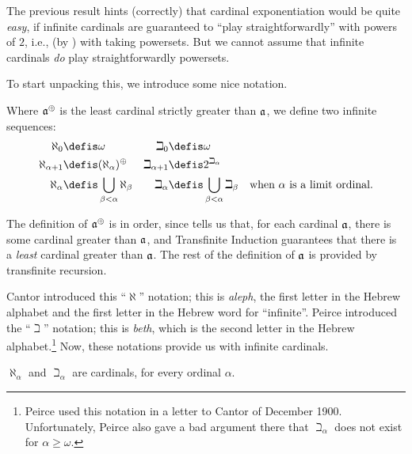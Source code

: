 \documentclass[../../../include/open-logic-section]{subfiles}
\begin{document}


The previous result hints (correctly) that cardinal exponentiation
would be quite \emph{easy}, if infinite cardinals are guaranteed to
``play straightforwardly'' with powers of $2$, i.e., (by
) with taking powersets. But we
cannot assume that infinite cardinals \emph{do} play straightforwardly 
powersets. 

To start unpacking this, we introduce some nice notation.

\begin{defn}
Where $\mathfrak{a}^{\oplus}$ is the least cardinal strictly greater
than $\mathfrak{a}$, we define two infinite sequences:
\begin{align*}
	\aleph_{0} &\defis \omega & 		
	\beth_{0} &\defis \omega\\
	\aleph_{\alpha \ordplus 1} &\defis \cardsucc{(\aleph_{\alpha})} &
	\beth_{\alpha+1} &\defis \cardexpo{2}{\beth_{\alpha}}\\
	\aleph_{\alpha} &\defis \bigcup_{\beta< \alpha} \aleph_{\beta} &
	\beth_{\alpha} &\defis \bigcup_{\beta < \alpha}\beth_{\beta} & \text{when $\alpha$ is a limit ordinal}.
	\end{align*}
\end{defn}

The definition of $\mathfrak{a}^{\oplus}$ is in order, since
 tells us that, for each
cardinal $\mathfrak{a}$, there is some cardinal greater than
$\mathfrak{a}$, and Transfinite Induction guarantees that there is a
\emph{least} cardinal greater than $\mathfrak{a}$. The rest of the
definition of $\mathfrak{a}$ is provided by transfinite recursion. 

Cantor introduced this ``$\aleph$'' notation; this is \emph{aleph},
the first letter in the Hebrew alphabet and the first letter in the
Hebrew word for ``infinite''. Peirce introduced the ``$\beth$''
notation; this is \emph{beth}, which is the second letter in the
Hebrew alphabet.\footnote{Peirce used this notation in a letter to
Cantor of December 1900. Unfortunately, Peirce also gave a bad
argument there that $\beth_\alpha$ does not exist for $\alpha \geq
\omega$.} Now, these notations provide us with infinite cardinals.

\begin{prop}
$\aleph_\alpha$ and $\beth_\alpha$ are cardinals, for every
ordinal $\alpha$. 
\end{prop}
\end{document}
